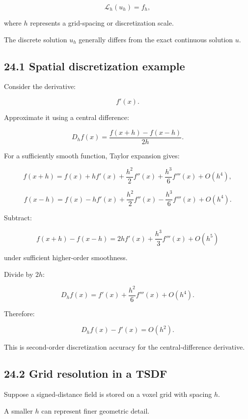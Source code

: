 \[ \mathcal L_h(u_h)=f_h, \]

where \(h\) represents a grid-spacing or discretization scale.

The discrete solution \(u_h\) generally differs from the exact continuous solution \(u\).

\subsection{24.1 Spatial discretization example}\label{02-foundations-ii-ch029-spatial-discretization-example}

\hypertarget{02-foundations-ii-ch029-spatial-discretization-example}{}

Consider the derivative:

\[ f'(x). \]

Approximate it using a central difference:

\[ D_hf(x)= \frac{f(x+h)-f(x-h)}{2h}. \]

For a sufficiently smooth function, Taylor expansion gives:

\[ f(x+h)= f(x)+hf'(x)+\frac{h^2}{2}f''(x) +\frac{h^3}{6}f'''(x)+O(h^4), \]

\[ f(x-h)= f(x)-hf'(x)+\frac{h^2}{2}f''(x) -\frac{h^3}{6}f'''(x)+O(h^4). \]

Subtract:

\[ f(x+h)-f(x-h) = 2hf'(x)+\frac{h^3}{3}f'''(x)+O(h^5) \]

under sufficient higher-order smoothness.

Divide by \(2h\):

\[ D_hf(x)= f'(x)+\frac{h^2}{6}f'''(x)+O(h^4). \]

Therefore:

\[ \boxed{ D_hf(x)-f'(x)=O(h^2) }. \]

This is second-order discretization accuracy for the central-difference derivative.

\subsection{24.2 Grid resolution in a TSDF}\label{02-foundations-ii-ch029-grid-resolution-in-a-tsdf}

\hypertarget{02-foundations-ii-ch029-grid-resolution-in-a-tsdf}{}

Suppose a signed-distance field is stored on a voxel grid with spacing \(h\).

A smaller \(h\) can represent finer geometric detail.

